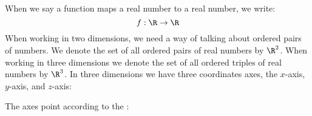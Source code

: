 \documentclass{ximera}
\begin{document}
When we say a function maps a real number to a real number, we write:
\[
f:\R\to \R
\]
When working in two dimensions, we need a way of talking about ordered
pairs of numbers. We denote the set of all ordered pairs of real
numbers by $\R^2$. When working in three dimensions we denote the set
of all ordered triples of real numbers by $\R^3$.  In three dimensions
we have three coordinates axes, the $x$-axis, $y$-axis, and $z$-axis:
\begin{image}[1in]
\end{image}
The axes point according to the :
\end{document}
